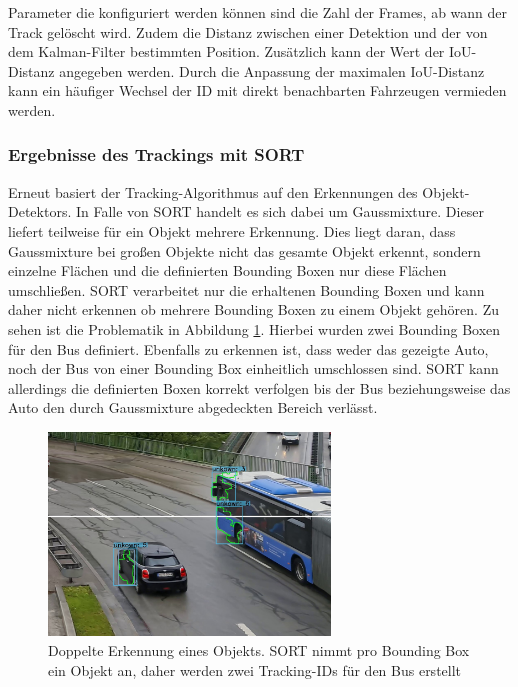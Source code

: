 \documentclass[conference]{IEEEtran}
\begin{document}
	Parameter die konfiguriert werden können sind die Zahl der Frames, ab wann der
	Track gelöscht wird. Zudem die Distanz zwischen einer Detektion und der von dem
	Kalman-Filter bestimmten Position. Zusätzlich kann der Wert der IoU-Distanz angegeben werden.
	Durch die Anpassung der maximalen IoU-Distanz
	kann ein häufiger Wechsel der ID mit direkt benachbarten Fahrzeugen vermieden werden.
	
	\subsubsection{Ergebnisse des Trackings mit SORT}
	Erneut basiert der Tracking-Algorithmus auf den Erkennungen des Objekt-Detektors. In Falle von SORT handelt es sich dabei um Gaussmixture. Dieser liefert teilweise für ein Objekt mehrere Erkennung. Dies liegt daran, dass Gaussmixture bei großen Objekte nicht das gesamte Objekt erkennt, sondern einzelne Flächen und die definierten Bounding Boxen nur diese Flächen umschließen. SORT verarbeitet nur die erhaltenen Bounding Boxen und kann daher nicht erkennen ob mehrere Bounding Boxen zu einem Objekt gehören. Zu sehen ist die Problematik in Abbildung \ref{sortdouble}. Hierbei wurden zwei Bounding Boxen für den Bus definiert. Ebenfalls zu erkennen ist, dass weder das gezeigte Auto, noch der Bus von einer Bounding Box einheitlich umschlossen sind. SORT kann allerdings die definierten Boxen korrekt verfolgen bis der Bus beziehungsweise das Auto den durch Gaussmixture abgedeckten Bereich verlässt. 
	
	\begin{figure}[!h]
		\begin{center}
			\includegraphics[width=7.5cm]{Media/sortdouble.jpg}
			\caption{Doppelte Erkennung eines Objekts. SORT nimmt pro Bounding Box ein Objekt an, daher werden zwei Tracking-IDs für den Bus erstellt}
			\label{sortdouble}
		\end{center}
	\end{figure}
\end{document}
